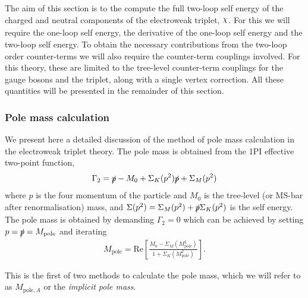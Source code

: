 \documentclass[11pt]{article}
\newcommand{\chiinline}{\raisebox{1.7pt}[1ex][1ex]{$\chi$}}
\def\Mp{M_{\text{pole}}}
\def\Mpa{M_{\text{pole},A}}
\begin{document}
The aim of this section is to the compute the full two-loop self energy of the charged and neutral components of the electroweak triplet, $\chiinline$.  For this we will require the one-loop self energy, the derivative of the one-loop self energy and the two-loop self energy.  To obtain the necessary contributions from the two-loop order counter-terms we will also require the counter-term couplings involved.  For this theory, these are limited to the tree-level counter-term couplings for the gauge bosons and the triplet, along with a single vertex correction.  All these quantities will be presented in the remainder of this section.


\subsubsection{Pole mass calculation}

We present here a detailed discussion of the method of pole mass calculation in the electroweak triplet theory.  The pole mass is obtained from the 1PI effective two-point function,
\begin{equation}
\Gamma_2=\slashed{p}-M_0+\Sigma_K(p^2)\slashed{p}+\Sigma_M(p^2) \label{eqn:propagator}
\end{equation}
where $p$ is the four momentum of the particle and $M_0$ is the tree-level (or MS-bar after renormalisation) mass, and $\Sigma(p^2)=\Sigma_M(p^2)+\slashed{p}\Sigma_K(p^2)$ is the self energy.  The pole mass is obtained by demanding $\Gamma_2=0$ which can be achieved by setting $p=\slashed{p}=\Mp$ and iterating
\begin{align}
\Mp=\text{Re}\left[\frac{M_0-\Sigma_M(\Mp^2)}{1+\Sigma_K(\Mp^2)}\right]. \label{eqn:M_pole_iterative}
\end{align}

This is the first of two methods to calculate the pole mass, which we will refer to as $\Mpa$ or the \textit{implicit pole mass}.\\
\end{document}
